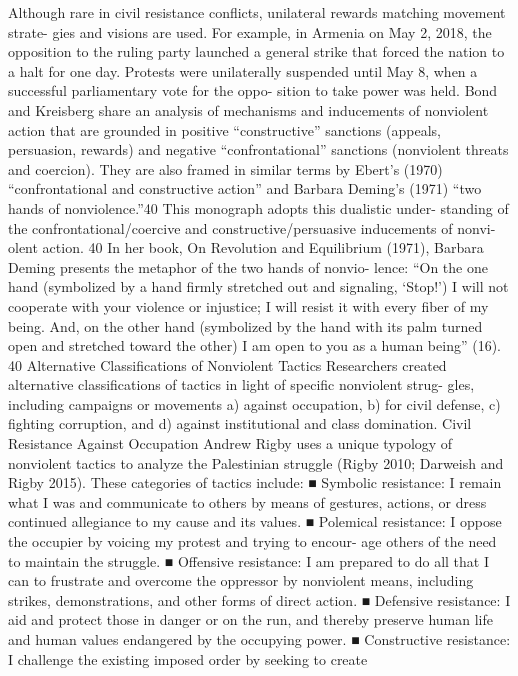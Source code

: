 \documentclass[twoside,a4paper,12pt,fleqn,openany]{extbook}
\begin{document}
Although rare in civil resistance conflicts, unilateral rewards matching movement strate-
gies and visions are used. For example, in Armenia on May 2, 2018, the opposition to the
ruling party launched a general strike that forced the nation to a halt for one day. Protests
were unilaterally suspended until May 8, when a successful parliamentary vote for the oppo-
sition to take power was held.
Bond and Kreisberg share an analysis of mechanisms and inducements of nonviolent
action that are grounded in positive “constructive” sanctions (appeals, persuasion, rewards)
and negative “confrontational” sanctions (nonviolent threats and coercion). They are also
framed in similar terms by Ebert’s (1970) “confrontational and constructive action” and Barbara
Deming’s (1971) “two hands of nonviolence.”40 This monograph adopts this dualistic under-
standing of the confrontational/coercive and constructive/persuasive inducements of nonvi-
olent action.
40
In her book, On Revolution and Equilibrium (1971), Barbara Deming presents the metaphor of the two hands of nonvio-
lence: “On the one hand (symbolized by a hand firmly stretched out and signaling, ‘Stop!’) I will not cooperate with
your violence or injustice; I will resist it with every fiber of my being. And, on the other hand (symbolized by the hand
with its palm turned open and stretched toward the other) I am open to you as a human being” (16).
40
Alternative Classifications of Nonviolent Tactics
Researchers created alternative classifications of tactics in light of specific nonviolent strug-
gles, including campaigns or movements a) against occupation, b) for civil defense, c) fighting
corruption, and d) against institutional and class domination.
Civil Resistance Against Occupation
Andrew Rigby uses a unique typology of nonviolent tactics to analyze the Palestinian struggle
(Rigby 2010; Darweish and Rigby 2015). These categories of tactics include:
■
 Symbolic resistance: I remain what I was and communicate to others by means of
gestures, actions, or dress continued allegiance to my cause and its values.
■
Polemical resistance: I oppose the occupier by voicing my protest and trying to encour-
age others of the need to maintain the struggle.
■
 Offensive resistance: I am prepared to do all that I can to frustrate and overcome the
oppressor by nonviolent means, including strikes, demonstrations, and other forms
of direct action.
■
 Defensive resistance: I aid and protect those in danger or on the run, and thereby
preserve human life and human values endangered by the occupying power.
■
Constructive resistance: I challenge the existing imposed order by seeking to create
\end{document}
